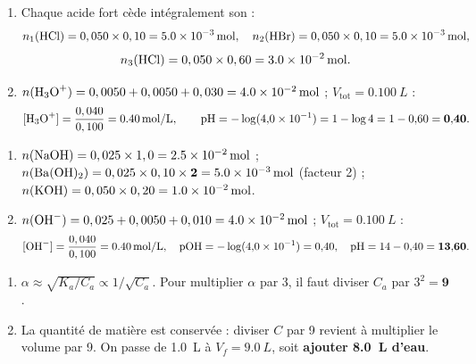 \documentclass[11pt,a4paper]{article}
\begin{document}

\begin{corrige}
\begin{enumerate}[label=\alph*)]
  \item Chaque acide fort cède intégralement son  :
        \[ n_1(\ce{HCl}) = 0,050\times0,10 = \qty{5,0e-3}{mol},\quad
           n_2(\ce{HBr}) = 0,050\times0,10 = \qty{5,0e-3}{mol}, \]
        \[ n_3(\ce{HCl}) = 0,050\times0,60 = \qty{3,0e-2}{mol}. \]
  \item $n(\ce{H3O+}) = 0,0050 + 0,0050 + 0,030 = \qty{4,0e-2}{mol}$ ; $V_{\text{tot}} = \qty{0,100}{L}$ :
        \[ [\ce{H3O+}] = \frac{0,040}{0,100} = \qty{0,40}{mol\per L},\qquad
           \mathrm{pH} = -\log(4{,}0\times10^{-1}) = 1 - \log 4 = 1 - 0{,}60 = \mathbf{0{,}40}. \]
\end{enumerate}
\end{corrige}

\begin{corrige}
\begin{enumerate}[label=\alph*)]
  \item $n(\ce{NaOH}) = 0,025\times1,0 = \qty{2,5e-2}{mol}$ ;
        $n(\ce{Ba(OH)2}) = 0,025\times0,10\times\mathbf{2} = \qty{5,0e-3}{mol}$ (facteur \num{2}) ;
        $n(\ce{KOH}) = 0,050\times0,20 = \qty{1,0e-2}{mol}$.
  \item $n(\ce{OH-}) = 0,025 + 0,0050 + 0,010 = \qty{4,0e-2}{mol}$ ; $V_{\text{tot}} = \qty{0,100}{L}$ :
        \[ [\ce{OH-}] = \frac{0,040}{0,100} = \qty{0,40}{mol\per L},\quad \mathrm{pOH} = -\log(4{,}0\times10^{-1})
           = 0{,}40,\quad \mathrm{pH} = 14 - 0{,}40 = \mathbf{13{,}60}. \]
\end{enumerate}
\end{corrige}

\begin{corrige}
\begin{enumerate}[label=\alph*)]
  \item $\alpha \approx \sqrt{K_a/C_a} \propto 1/\sqrt{C_a}$. Pour multiplier $\alpha$ par \num{3}, il faut diviser
        $C_a$ par $3^2 = \mathbf{9}$.
  \item La quantité de matière est conservée : diviser $C$ par \num{9} revient à multiplier le volume par \num{9}.
        On passe de \qty{1,0}{L} à $V_f = \qty{9,0}{L}$, soit \textbf{ajouter \qty{8,0}{L} d'eau}.
\end{enumerate}
\end{corrige}
\end{document}
